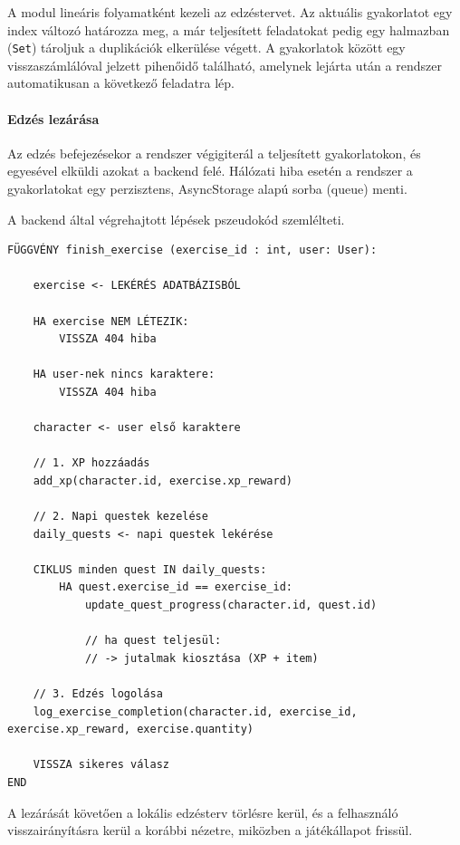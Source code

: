 \documentclass[
]{thesis-ekf}
\theoremstyle{definition}
\theoremstyle{remark}
\begin{document}
A modul lineáris folyamatként kezeli az edzéstervet. Az aktuális gyakorlatot egy index változó határozza meg, a már teljesített feladatokat pedig egy halmazban (\texttt{Set}) tároljuk a duplikációk elkerülése végett. A gyakorlatok között egy visszaszámlálóval jelzett pihenőidő található, amelynek lejárta után a rendszer automatikusan a következő feladatra lép.

\paragraph{Edzés lezárása}

Az edzés befejezésekor a rendszer végigiterál a teljesített gyakorlatokon, és egyesével elküldi azokat a backend felé. Hálózati hiba esetén a rendszer a gyakorlatokat egy perzisztens, AsyncStorage alapú sorba (queue) menti.

A backend által végrehajtott lépések  pszeudokód szemlélteti.

\begin{lstlisting}[style=pseudostyle, caption={Edzés teljesítésének feldolgozása}, label={code_exercise_finish}]
FÜGGVÉNY finish_exercise (exercise_id : int, user: User):

    exercise <- LEKÉRÉS ADATBÁZISBÓL

    HA exercise NEM LÉTEZIK:
        VISSZA 404 hiba

    HA user-nek nincs karaktere:
        VISSZA 404 hiba

    character <- user első karaktere

    // 1. XP hozzáadás
    add_xp(character.id, exercise.xp_reward)

    // 2. Napi questek kezelése
    daily_quests <- napi questek lekérése

    CIKLUS minden quest IN daily_quests:
        HA quest.exercise_id == exercise_id:
            update_quest_progress(character.id, quest.id)

            // ha quest teljesül:
            // -> jutalmak kiosztása (XP + item)
    
    // 3. Edzés logolása
    log_exercise_completion(character.id, exercise_id, exercise.xp_reward, exercise.quantity)

    VISSZA sikeres válasz
END

\end{lstlisting}

A lezárását követően a lokális edzésterv törlésre kerül, és a felhasználó visszairányításra kerül a korábbi nézetre, miközben a játékállapot frissül.
\end{document}
